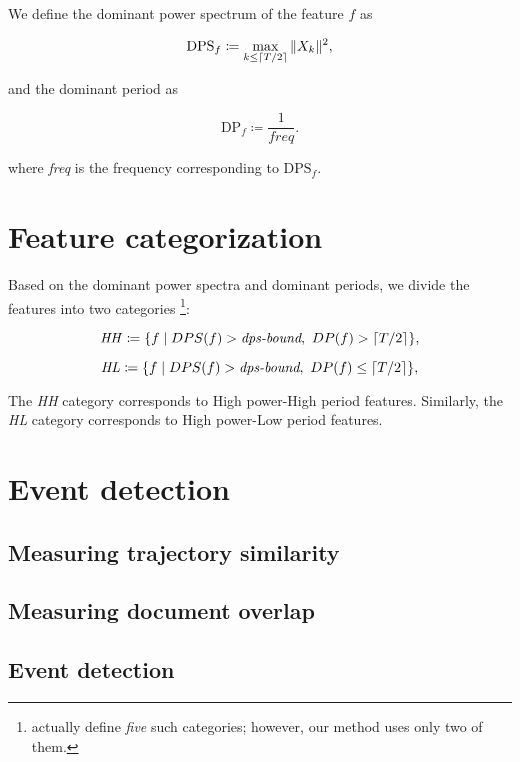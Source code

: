 We define the dominant power spectrum of the feature $f$ as

\begin{equation}
	\text{DPS}_{f} \coloneqq \max_{k \leq \lceil T/2\rceil}{\|X_{k}\|^{2}},
\end{equation}

and the dominant period as

\begin{equation}
	\text{DP}_{f} \coloneqq \frac{1}{\mathit{freq}}.
\end{equation}

where \textit{freq} is the frequency corresponding to $\text{DPS}_{f}$.


\section{Feature categorization}
Based on the dominant power spectra and dominant periods, we divide the features into two categories \footnote{\cite{event-detection} actually define \textit{five} such categories; however, our method uses only two of them.}:

\begin{equation}
	\mathit{HH} \coloneqq \{f \mid DPS(f) > \textit{dps-bound}, ~ DP(f) > \lceil T / 2\rceil\},
\end{equation}

\begin{equation}
	\mathit{HL} \coloneqq \{f \mid DPS(f) > \textit{dps-bound}, ~ DP(f) \leq \lceil T / 2\rceil\},
\end{equation}

The \textit{HH} category corresponds to High power-High period features. Similarly, the \textit{HL} category corresponds to High power-Low period features.



\section{Event detection}

\subsection{Measuring trajectory similarity}

\subsection{Measuring document overlap}

\subsection{Event detection}